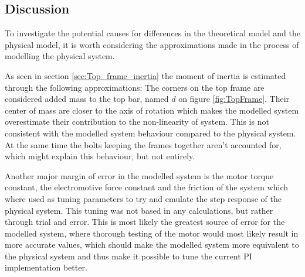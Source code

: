 \documentclass[../../Main]{subfiles}
\begin{document}
\subsection{Discussion}
\label{sec:discussion}


To investigate the potential causes for differences in  the theoretical model and the physical model, it is worth considering the approximations made in the process of modelling the physical system.

As seen in section \ref{sec:Top_frame_inertia} the moment of inertia is estimated through the following approximations: The corners on the top frame are considered added mass to the top bar, named $d$ on figure \ref{fig:TopFrame}. Their center of mass are closer to the axis of rotation which makes the modelled system overestimate their contribution to the non-linearity of system. This is not consistent with the modelled system behaviour compared to the physical system.
At the same time the bolts keeping the frames together aren't accounted for, which might explain this behaviour, but not entirely.


Another major margin of error in the modelled system is the motor torque constant, the electromotive force constant and the friction of the system which where used as tuning parameters to try and emulate the step response of the physical system. This tuning was not based in any calculations, but rather through trial and error.
This is most likely the greatest source of error for the modelled system,  where thorough testing of the motor would most likely result in more accurate values, which should make the modelled system more equivalent to the physical system and thus make it possible to tune the current PI implementation better.
\end{document}

